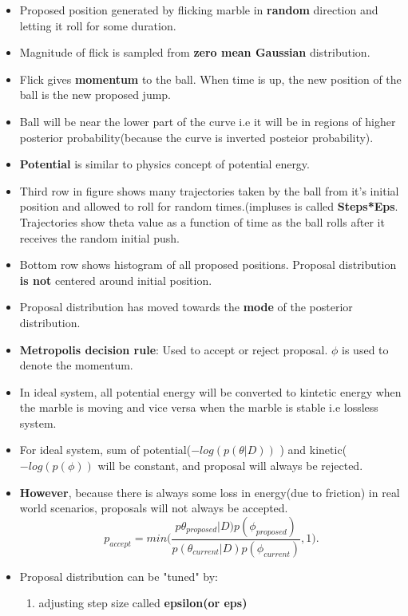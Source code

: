\documentclass[a4paper]{article}
\begin{document}
\begin{itemize}
    \item Proposed position generated by flicking marble in \textbf{random} direction and letting it roll for some duration. 
    \item Magnitude of flick is sampled from \textbf{zero mean Gaussian } distribution. 
    \item Flick gives \textbf{momentum} to the ball. When time is up, the new position of the ball is the new proposed jump.
    \item Ball will be near the lower part of the curve i.e it will be in regions of higher posterior probability(because the curve is inverted posteior probability).
    \item \textbf{Potential} is similar to physics concept of potential energy. 
    \item Third row in figure shows many trajectories taken by the ball from it's initial position and allowed to roll for random times.(impluses is called \textbf{Steps*Eps}. Trajectories show theta value as a function of time as the ball rolls after it receives the random initial push.
    \item Bottom row shows histogram of all proposed positions. Proposal distribution \textbf{is not} centered around initial position. 
    \item Proposal distribution has moved towards the \textbf{mode} of the posterior distribution. 
    \item \textbf{Metropolis decision rule}: Used to accept or reject proposal. $\phi$ is used to denote the momentum.
    \item In ideal system, all potential energy will be converted to kintetic energy when the marble is moving and vice versa when the marble is stable i.e lossless system.
    \item For ideal system, sum of potential($-log(p(\theta|D))$ ) and kinetic($-log(p(\phi))$ will be constant, and proposal will always be rejected.
    \item \textbf{However}, because there is always some loss in energy(due to friction) in real world scenarios, proposals will not always be accepted. 
        \[
            p_{accept} = min\bigg(\frac{p\theta_{proposed}|D)p(\phi_{proposed})}{p(\theta_{current}|D)p(\phi_{current})}, 1\bigg)
        .\] 
    \item Proposal distribution can be "tuned" by:
    \begin{enumerate}
        \item adjusting step size called \textbf{epsilon(or eps)}

\end{enumerate}
\end{itemize}
\end{document}
